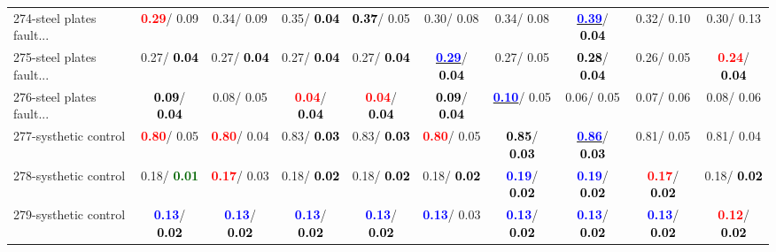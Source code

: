 \begin{table}[h]
\begin{center}
{\begin{tabular}{lc|c|c|c|c|c|c|c|c}
274-steel plates fault... & \textcolor{red}{\textbf{  0.29}}/  0.09 &   0.34/  0.09 &   0.35/\textcolor{black}{\textbf{  0.04}} & \textcolor{black}{\textbf{  0.37}}/  0.05 &   0.30/  0.08 &   0.34/  0.08 & \underline{\textcolor{blue}{\textbf{  0.39}}}/\textcolor{black}{\textbf{  0.04}} &   0.32/  0.10 &   0.30/  0.13 \\
275-steel plates fault... &   0.27/\textcolor{black}{\textbf{  0.04}} &   0.27/\textcolor{black}{\textbf{  0.04}} &   0.27/\textcolor{black}{\textbf{  0.04}} &   0.27/\textcolor{black}{\textbf{  0.04}} & \underline{\textcolor{blue}{\textbf{  0.29}}}/\textcolor{black}{\textbf{  0.04}} &   0.27/  0.05 & \textcolor{black}{\textbf{  0.28}}/\textcolor{black}{\textbf{  0.04}} &   0.26/  0.05 & \textcolor{red}{\textbf{  0.24}}/\textcolor{black}{\textbf{  0.04}} \\
276-steel plates fault... & \textcolor{black}{\textbf{  0.09}}/\textcolor{black}{\textbf{  0.04}} &   0.08/  0.05 & \textcolor{red}{\textbf{  0.04}}/\textcolor{black}{\textbf{  0.04}} & \textcolor{red}{\textbf{  0.04}}/\textcolor{black}{\textbf{  0.04}} & \textcolor{black}{\textbf{  0.09}}/\textcolor{black}{\textbf{  0.04}} & \underline{\textcolor{blue}{\textbf{  0.10}}}/  0.05 &   0.06/  0.05 &   0.07/  0.06 &   0.08/  0.06 \\
277-systhetic control & \textcolor{red}{\textbf{  0.80}}/  0.05 & \textcolor{red}{\textbf{  0.80}}/  0.04 &   0.83/\textcolor{black}{\textbf{  0.03}} &   0.83/\textcolor{black}{\textbf{  0.03}} & \textcolor{red}{\textbf{  0.80}}/  0.05 & \textcolor{black}{\textbf{  0.85}}/\textcolor{black}{\textbf{  0.03}} & \underline{\textcolor{blue}{\textbf{  0.86}}}/\textcolor{black}{\textbf{  0.03}} &   0.81/  0.05 &   0.81/  0.04 \\ \hline
278-systhetic control &   0.18/\textcolor{darkgreen}{\textbf{  0.01}} & \textcolor{red}{\textbf{  0.17}}/  0.03 &   0.18/\textcolor{black}{\textbf{  0.02}} &   0.18/\textcolor{black}{\textbf{  0.02}} &   0.18/\textcolor{black}{\textbf{  0.02}} & \textcolor{blue}{\textbf{  0.19}}/\textcolor{black}{\textbf{  0.02}} & \textcolor{blue}{\textbf{  0.19}}/\textcolor{black}{\textbf{  0.02}} & \textcolor{red}{\textbf{  0.17}}/\textcolor{black}{\textbf{  0.02}} &   0.18/\textcolor{black}{\textbf{  0.02}} \\
279-systhetic control & \textcolor{blue}{\textbf{  0.13}}/\textcolor{black}{\textbf{  0.02}} & \textcolor{blue}{\textbf{  0.13}}/\textcolor{black}{\textbf{  0.02}} & \textcolor{blue}{\textbf{  0.13}}/\textcolor{black}{\textbf{  0.02}} & \textcolor{blue}{\textbf{  0.13}}/\textcolor{black}{\textbf{  0.02}} & \textcolor{blue}{\textbf{  0.13}}/  0.03 & \textcolor{blue}{\textbf{  0.13}}/\textcolor{black}{\textbf{  0.02}} & \textcolor{blue}{\textbf{  0.13}}/\textcolor{black}{\textbf{  0.02}} & \textcolor{blue}{\textbf{  0.13}}/\textcolor{black}{\textbf{  0.02}} & \textcolor{red}{\textbf{  0.12}}/\textcolor{black}{\textbf{  0.02}} \\

\end{tabular}}
\end{center}
\end{table}
